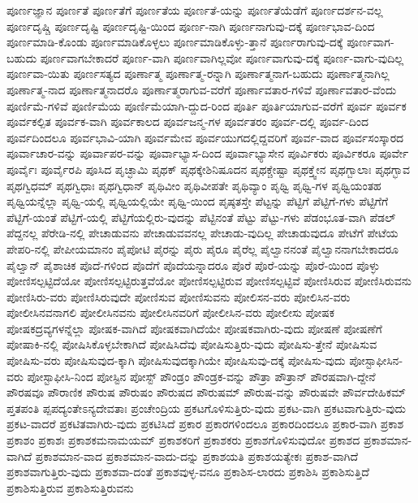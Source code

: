 {ಪೂರ್ಣಜ್ಞಾನ
ಪೂರ್ಣತೆ
ಪೂರ್ಣತೆಗೆ
ಪೂರ್ಣತೆಯ
ಪೂರ್ಣತೆ-ಯನ್ನು
ಪೂರ್ಣತೆಯೆಡೆಗೆ
ಪೂರ್ಣದರ್ಶನ-ವಲ್ಲ
ಪೂರ್ಣದೃಷ್ಚಿ
ಪೂರ್ಣದೃಷ್ಟಿ
ಪೂರ್ಣದೃಷ್ಟಿ-ಯಿಂದ
ಪೂರ್ಣ-ನಾಗಿ
ಪೂರ್ಣನಾಗುವು-ದಕ್ಕೆ
ಪೂರ್ಣಭಾವ-ದಿಂದ
ಪೂರ್ಣಮಾಡಿ-ಕೊಂಡು
ಪೂರ್ಣಮಾಡಿಕೊಳ್ಳಲು
ಪೂರ್ಣಮಾಡಿಕೊಳ್ಳು-ತ್ತಾನೆ
ಪೂರ್ಣರಾಗುವು-ದಕ್ಕೆ
ಪೂರ್ಣವಾಗ-ಬಹುದು
ಪೂರ್ಣವಾಗಬೇಕಾದರೆ
ಪೂರ್ಣ-ವಾಗಿ
ಪೂರ್ಣವಾಗಿಲ್ಲವೋ
ಪೂರ್ಣವಾಗುವು-ದಕ್ಕೆ
ಪೂರ್ಣ-ವಾಗು-ವುದಿಲ್ಲ
ಪೂರ್ಣವಾ-ಯಿತು
ಪೂರ್ಣಸತ್ಯದ
ಪೂರ್ಣಾತ್ಮ
ಪೂರ್ಣಾತ್ಮ-ರನ್ನಾಗಿ
ಪೂರ್ಣಾತ್ಮನಾಗ-ಬಹುದು
ಪೂರ್ಣಾತ್ಮನಾಗಿಲ್ಲ
ಪೂರ್ಣಾತ್ಮ-ನಾದ
ಪೂರ್ಣಾತ್ಮನಾದರೊ
ಪೂರ್ಣಾತ್ಮರಾಗುವ-ವರೆಗೆ
ಪೂರ್ಣಾವತಾರ-ಗಳಿವೆ
ಪೂರ್ಣಾವತಾರ-ವೆಂದು
ಪೂರ್ಣಿಮೆ-ಗಳಿವೆ
ಪೂರ್ಣಿಮೆಯ
ಪೂರ್ಣಿಮೆಯಾಗಿ-ದ್ದುದ-ರಿಂದ
ಪೂರ್ತಿ
ಪೂರ್ತಿಯಾಗುವ-ವರೆಗೆ
ಪೂರ್ವ
ಪೂರ್ವಕ
ಪೂರ್ವಕಲ್ಪಿತ
ಪೂರ್ವಕ-ವಾಗಿ
ಪೂರ್ವಕಾಲದ
ಪೂರ್ವಜನ್ಮ-ಗಳ
ಪೂರ್ವತರಂ
ಪೂರ್ವ-ದಲ್ಲಿ
ಪೂರ್ವ-ದಿಂದ
ಪೂರ್ವದಿಂದಲೂ
ಪೂರ್ವಭಾವಿ-ಯಾಗಿ
ಪೂರ್ವಮೇವ
ಪೂರ್ವಯುಗದಲ್ಲಿದ್ದವರಿಗೆ
ಪೂರ್ವ-ವಾದ
ಪೂರ್ವಸಂಸ್ಕಾರದ
ಪೂರ್ವಾಚಾರ-ವನ್ನು
ಪೂರ್ವಾಪರ-ವನ್ನು
ಪೂರ್ವಾಭ್ಯಾಸ-ದಿಂದ
ಪೂರ್ವಾಭ್ಯಾಸೇನ
ಪೂರ್ವಿಕರು
ಪೂರ್ವಿಕರೂ
ಪೂರ್ವೇ
ಪೂರ್ವೈಃ
ಪೂರ್ವೈರಪಿ
ಪೂಸಿದ
ಪೃಚ್ಛಾಮಿ
ಪೃಥಕ್
ಪೃಥಕ್ಕೇಶಿನಿಷೂದನ
ಪೃಥಕ್ಚೇಷ್ಟಾ
ಪೃಥಕ್ತ್ವೇನ
ಪೃಥಗ್ಬಾಲಾಃ
ಪೃಥಗ್ಭಾವ
ಪೃಥಗ್ವಿಧಮ್
ಪೃಥಗ್ವಿಧಾಃ
ಪೃಥಗ್ವಿಧಾನ್
ಪೃಥಿವೀಂ
ಪೃಥಿವೀಪತೇ
ಪೃಥಿವ್ಯಾಂ
ಪೃಥ್ವಿ
ಪೃಥ್ವಿ-ಗಳ
ಪೃಥ್ವಿಯಂತಹ
ಪೃಥ್ವಿಯನ್ನೆಲ್ಲಾ
ಪೃಥ್ವಿ-ಯಲ್ಲಿ
ಪೃಥ್ವಿಯಲ್ಲಿಯೇ
ಪೃಥ್ವಿ-ಯಿಂದ
ಪೃಷ್ಠತಸ್ತೇ
ಪೆಟ್ಟನ್ನು
ಪೆಟ್ಟಿಗೆ
ಪೆಟ್ಟಿಗೆ-ಗಳು
ಪೆಟ್ಟಿಗೆಗೆ
ಪೆಟ್ಟಿಗೆ-ಯಂತೆ
ಪೆಟ್ಟಿಗೆ-ಯಲ್ಲಿ
ಪೆಟ್ಟಿಗೆಯಲ್ಲಿರು-ವುದನ್ನು
ಪೆಟ್ಟಿನಂತೆ
ಪೆಟ್ಟು
ಪೆಟ್ಟು-ಗಳು
ಪೆಡಂಭೂತ-ವಾಗಿ
ಪೆಡಲ್
ಪೆದ್ದನಲ್ಲ
ಪೆರೇಡಿ-ನಲ್ಲಿ
ಪೇಚಾಡುವನು
ಪೇಚಾಡುವವನಲ್ಲ
ಪೇಚಾಡು-ವುದಿಲ್ಲ
ಪೇಚಾಡುವುದೂ
ಪೇಟೆಗೆ
ಪೇಟೆಯ
ಪೇಪರಿ-ನಲ್ಲಿ
ಪೇಪೀಯಮಾನಂ
ಪೈಪೋಟಿ
ಪೈರನ್ನು
ಪೈರು
ಪೈರೂ
ಪೈರೆಲ್ಲ
ಪೈಲ್ವಾನನಂತೆ
ಪೈಲ್ವಾನನಾಗಬೇಕಾದರೂ
ಪೈಲ್ವಾನ್
ಪೈಶಾಚಿಕ
ಪೊದೆ-ಗಳಿಂದ
ಪೊದೆಗೆ
ಪೊದೆಯನ್ನಾದರೂ
ಪೊರೆ
ಪೊರೆ-ಯನ್ನು
ಪೊರೆ-ಯಿಂದ
ಪೊಳ್ಳು
ಪೋಣಿಸಲ್ಪಟ್ಟಿದೆಯೋ
ಪೋಣಿಸಲ್ಪಟ್ಟಿರುತ್ತವೆಯೋ
ಪೋಣಿಸಲ್ಪಟ್ಟಿರುವ
ಪೋಣಿಸಲ್ಪಟ್ಟಿವೆ
ಪೋಣಿಸಿರುವ
ಪೋಣಿಸಿರುವನು
ಪೋಣಿಸಿರು-ವರು
ಪೋಣಿಸಿರುವುದೇ
ಪೋಣಿಸುವ
ಪೋಣಿಸುವನು
ಪೋಲಿಸನ-ವರು
ಪೋಲಿಸಿನ-ವರು
ಪೋಲೀಸಿನವನಾಗಲಿ
ಪೋಲೀಸಿನವನು
ಪೋಲೀಸಿನವರಿಗೆ
ಪೋಲೀಸಿನ-ವರು
ಪೋಲೀಸು
ಪೋಷಕ
ಪೋಷಕದ್ರವ್ಯಗಳನ್ನೆಲ್ಲಾ
ಪೋಷಕ-ವಾಗಿದೆ
ಪೋಷಕವಾಗಿದೆಯೇ
ಪೋಷಕವಾಗಿರು-ವುದು
ಪೋಷಣೆ
ಪೋಷಣೆಗೆ
ಪೋಷಾಕಿ-ನಲ್ಲಿ
ಪೋಷಿಸಿಕೊಳ್ಳಬೇಕಾಗಿದೆ
ಪೋಷಿಸಿದೆವು
ಪೋಷಿಸುತ್ತಿರು-ವುದು
ಪೋಷಿಸು-ತ್ತೇನೆ
ಪೋಷಿಸುವ
ಪೋಷಿಸು-ವರು
ಪೋಷಿಸುವುದ-ಕ್ಕಾಗಿ
ಪೋಷಿಸುವುದಕ್ಕಾಗಿಯೇ
ಪೋಷಿಸುವು-ದಕ್ಕೆ
ಪೋಷಿಸು-ವುದು
ಪೋಸ್ಟಾಫೀಸಿನ-ವರು
ಪೋಸ್ಟಾಫೀಸಿ-ನಿಂದ
ಪೋಸ್ಟಿನ
ಪೋಸ್ಟ್
ಪೌಂಡ್ರಂ
ಪೌಂಡ್ರಕ-ವನ್ನು
ಪೌತ್ರಾ
ಪೌತ್ರಾನ್
ಪೌರಷವಾಗಿ-ದ್ದೇನೆ
ಪೌರಷವೂ
ಪೌರಾಣಿಕ
ಪೌರುಷ
ಪೌರುಷಂ
ಪೌರುಷದ
ಪೌರುಷಮ್
ಪೌರುಷ-ವನ್ನು
ಪೌರುಷವೇ
ಪೌರ್ವದೇಹಿಕಮ್
ಪ್ತತಪಂತಿ
ಪ್ಪಪದ್ಯಂತೇಽನ್ಯದೇವತಾಃ
ಪ್ರಂಚೇಂದ್ರಿಯ
ಪ್ರಕಟಗೊಳಿಸುತ್ತಿರು-ವುದು
ಪ್ರಕಟ-ವಾಗಿ
ಪ್ರಕಟವಾಗುತ್ತಿರು-ವುದು
ಪ್ರಕಟ-ವಾದರೆ
ಪ್ರಕಟಿತವಾಗಿರು-ವುದು
ಪ್ರಕಟಿಸಿದೆ
ಪ್ರಕಾರ
ಪ್ರಕಾರಗಳಿಂದಲೂ
ಪ್ರಕಾರದಿಂದಲೂ
ಪ್ರಕಾರ-ವಾಗಿ
ಪ್ರಕಾಶ
ಪ್ರಕಾಶಂ
ಪ್ರಕಾಶಃ
ಪ್ರಕಾಶಕಮನಾಮಯಮ್
ಪ್ರಕಾಶಕರಿಗೆ
ಪ್ರಕಾಶಕರು
ಪ್ರಕಾಶಗೊಳಿಸುವುದೋ
ಪ್ರಕಾಶದ
ಪ್ರಕಾಶಮಾನ-ವಾಗಿದೆ
ಪ್ರಕಾಶಮಾನ-ವಾದ
ಪ್ರಕಾಶಮಾನ-ವಾದು-ದನ್ನು
ಪ್ರಕಾಶಯತಿ
ಪ್ರಕಾಶಯತ್ಯೇಕಃ
ಪ್ರಕಾಶ-ವಾಗಿದೆ
ಪ್ರಕಾಶವಾಗುತ್ತಿರು-ವುದು
ಪ್ರಕಾಶವಾ-ದಂತೆ
ಪ್ರಕಾಶವುಳ್ಳ-ವನೂ
ಪ್ರಕಾಶಿಸ-ಲಾರದು
ಪ್ರಕಾಶಿಸಿ
ಪ್ರಕಾಶಿಸುತ್ತಿದೆ
ಪ್ರಕಾಶಿಸುತ್ತಿರುವ
ಪ್ರಕಾಶಿಸುತ್ತಿರುವನು
}
